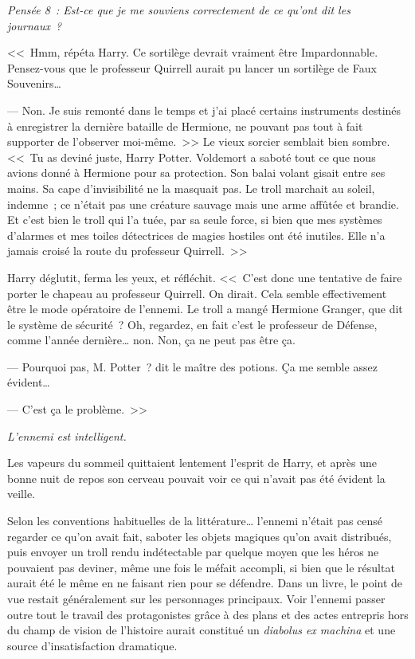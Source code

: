 \emph{Pensée 8~: Est-ce que je me souviens correctement de ce qu'ont dit les journaux~?}

<<~Hmm, répéta Harry. Ce sortilège devrait vraiment être Impardonnable. Pensez-vous que le professeur Quirrell aurait pu lancer un sortilège de Faux Souvenirs…

--- Non. Je suis remonté dans le temps et j'ai placé certains instruments destinés à enregistrer la dernière bataille de Hermione, ne pouvant pas tout à fait supporter de l'observer moi-même.~>> Le vieux sorcier semblait bien sombre. <<~Tu as deviné juste, Harry Potter. Voldemort a saboté tout ce que nous avions donné à Hermione pour sa protection. Son balai volant gisait entre ses mains. Sa cape d'invisibilité ne la masquait pas. Le troll marchait au soleil, indemne~; ce n'était pas une créature sauvage mais une arme affûtée et brandie. Et c'est bien le troll qui l'a tuée, par sa seule force, si bien que mes systèmes d'alarmes et mes toiles détectrices de magies hostiles ont été inutiles. Elle n'a jamais croisé la route du professeur Quirrell.~>>

Harry déglutit, ferma les yeux, et réfléchit. <<~C'est donc une tentative de faire porter le chapeau au professeur Quirrell. On dirait. Cela semble effectivement être le mode opératoire de l'ennemi. Le troll a mangé Hermione Granger, que dit le système de sécurité~? Oh, regardez, en fait c'est le professeur de Défense, comme l'année dernière… non. Non, ça ne peut pas être ça.

--- Pourquoi pas, M. Potter~? dit le maître des potions. Ça me semble assez évident…

--- C'est ça le problème.~>>

\emph{L'ennemi est intelligent.}

Les vapeurs du sommeil quittaient lentement l'esprit de Harry, et après une bonne nuit de repos son cerveau pouvait voir ce qui n'avait pas été évident la veille.

Selon les conventions habituelles de la littérature… l'ennemi n'était pas censé regarder ce qu'on avait fait, saboter les objets magiques qu'on avait distribués, puis envoyer un troll rendu indétectable par quelque moyen que les héros ne pouvaient pas deviner, même une fois le méfait accompli, si bien que le résultat aurait été le même en ne faisant rien pour se défendre. Dans un livre, le point de vue restait généralement sur les personnages principaux. Voir l'ennemi passer outre tout le travail des protagonistes grâce à des plans et des actes entrepris hors du champ de vision de l'histoire aurait constitué un \emph{diabolus ex machina} et une source d'insatisfaction dramatique.

